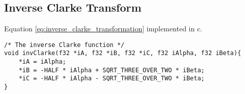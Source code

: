 \subsection{Inverse Clarke Transform}
\label{app:inverse_clarke}
Equation \ref{eq:inverse_clarke_transformation} implemented in c.

\begin{lstlisting}[style=c, caption=Embedded Inverse Clarke Transformation., label=app:code:inverse_clarke]
/* The inverse Clarke function */
void invClarke(f32 *iA, f32 *iB, f32 *iC, f32 iAlpha, f32 iBeta){
	*iA = iAlpha;
	*iB = -HALF * iAlpha + SQRT_THREE_OVER_TWO * iBeta;
	*iC = -HALF * iAlpha - SQRT_THREE_OVER_TWO * iBeta;
}
\end{lstlisting}
